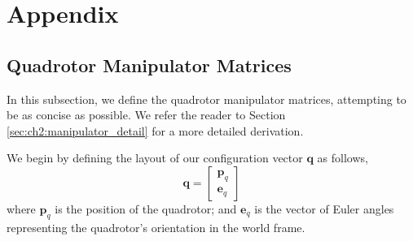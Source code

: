 \section{Appendix}

\subsection{Quadrotor Manipulator Matrices}
\label{sec:ch3:manipulator}

In this subsection, we define the quadrotor manipulator matrices, attempting to be as concise as possible.
We refer the reader to Section \ref{sec:ch2:manipulator_detail} for a more detailed derivation.

We begin by defining the layout of our configuration vector $\mathbf{q}$ as follows,
%
\begin{equation}
\mathbf{q} = 
\begin{bmatrix}
\mathbf{p}_q \\
\mathbf{e}_q
\end{bmatrix}
\end{equation}
%
where
$\mathbf{p}_q$ is the position of the quadrotor;
and $\mathbf{e}_q$ is the vector of Euler angles representing the quadrotor's orientation in the world frame.

